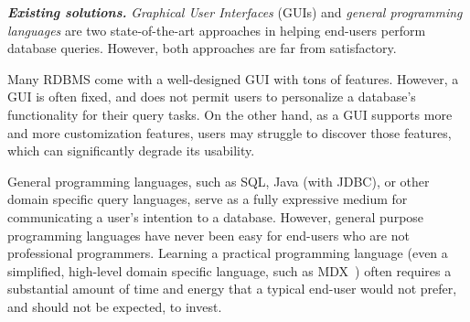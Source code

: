 









\vspace{1mm}
\noindent \textbf{\textit{Existing solutions.}}
\textit{Graphical User Interfaces} (GUIs) and \textit{general programming languages}
are two state-of-the-art approaches in helping end-users perform
database queries. However, both approaches are far from satisfactory.

Many RDBMS come with a well-designed GUI with tons of features.
However, 
a GUI is often fixed, and does not permit users to personalize
a database's functionality for their query tasks. On the other hand,
as a GUI supports more and more customization features, users
may struggle to discover those features, which can significantly
degrade its usability. 

General programming languages, such as SQL,
Java (with JDBC), or other domain specific query languages, 
serve as a fully expressive medium  for
communicating a user's intention to a database. However, 
general purpose programming languages have never been easy for
end-users who are not professional programmers.  Learning
a practical programming language (even a simplified, high-level domain
specific language, such as MDX~\cite{mdx}) often requires a substantial amount
of time and energy that a typical end-user would not prefer,
and should not be expected, to invest. 



